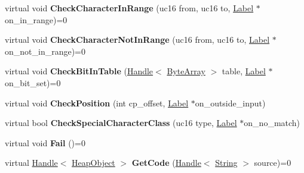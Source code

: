\begin{DoxyCompactItemize}
\item 
virtual void {\bfseries Check\+Character\+In\+Range} (uc16 from, uc16 to, \hyperlink{classv8_1_1internal_1_1_label}{Label} $\ast$on\+\_\+in\+\_\+range)=0\hypertarget{classv8_1_1internal_1_1_reg_exp_macro_assembler_a873c96a4e121d2d86129085b086d3ced}{}\label{classv8_1_1internal_1_1_reg_exp_macro_assembler_a873c96a4e121d2d86129085b086d3ced}

\item 
virtual void {\bfseries Check\+Character\+Not\+In\+Range} (uc16 from, uc16 to, \hyperlink{classv8_1_1internal_1_1_label}{Label} $\ast$on\+\_\+not\+\_\+in\+\_\+range)=0\hypertarget{classv8_1_1internal_1_1_reg_exp_macro_assembler_a63f2f1fe5214dbbd5143dc25d3c25279}{}\label{classv8_1_1internal_1_1_reg_exp_macro_assembler_a63f2f1fe5214dbbd5143dc25d3c25279}

\item 
virtual void {\bfseries Check\+Bit\+In\+Table} (\hyperlink{classv8_1_1internal_1_1_handle}{Handle}$<$ \hyperlink{classv8_1_1internal_1_1_byte_array}{Byte\+Array} $>$ table, \hyperlink{classv8_1_1internal_1_1_label}{Label} $\ast$on\+\_\+bit\+\_\+set)=0\hypertarget{classv8_1_1internal_1_1_reg_exp_macro_assembler_a26238606beb5c4dd46ccf3bd08f400ac}{}\label{classv8_1_1internal_1_1_reg_exp_macro_assembler_a26238606beb5c4dd46ccf3bd08f400ac}

\item 
virtual void {\bfseries Check\+Position} (int cp\+\_\+offset, \hyperlink{classv8_1_1internal_1_1_label}{Label} $\ast$on\+\_\+outside\+\_\+input)\hypertarget{classv8_1_1internal_1_1_reg_exp_macro_assembler_aa506d0e3f87c6934d21ced6a776a729c}{}\label{classv8_1_1internal_1_1_reg_exp_macro_assembler_aa506d0e3f87c6934d21ced6a776a729c}

\item 
virtual bool {\bfseries Check\+Special\+Character\+Class} (uc16 type, \hyperlink{classv8_1_1internal_1_1_label}{Label} $\ast$on\+\_\+no\+\_\+match)\hypertarget{classv8_1_1internal_1_1_reg_exp_macro_assembler_a50f9c35c57778c72994841897fda6d6b}{}\label{classv8_1_1internal_1_1_reg_exp_macro_assembler_a50f9c35c57778c72994841897fda6d6b}

\item 
virtual void {\bfseries Fail} ()=0\hypertarget{classv8_1_1internal_1_1_reg_exp_macro_assembler_a0a9cebd794b4db9b3561ef1c2193887e}{}\label{classv8_1_1internal_1_1_reg_exp_macro_assembler_a0a9cebd794b4db9b3561ef1c2193887e}

\item 
virtual \hyperlink{classv8_1_1internal_1_1_handle}{Handle}$<$ \hyperlink{classv8_1_1internal_1_1_heap_object}{Heap\+Object} $>$ {\bfseries Get\+Code} (\hyperlink{classv8_1_1internal_1_1_handle}{Handle}$<$ \hyperlink{classv8_1_1internal_1_1_string}{String} $>$ source)=0\hypertarget{classv8_1_1internal_1_1_reg_exp_macro_assembler_abcd2973036a4f070c0fccf2ed45af9ce}{}\label{classv8_1_1internal_1_1_reg_exp_macro_assembler_abcd2973036a4f070c0fccf2ed45af9ce}


\end{DoxyCompactItemize}
